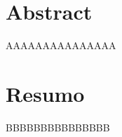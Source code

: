 \begingroup
\let\clearpage\relax

\chapter*{Abstract}
\thispagestyle{empty}

AAAAAAAAAAAAAAA

\chapter*{Resumo}
\thispagestyle{empty}

BBBBBBBBBBBBBBB

\endgroup